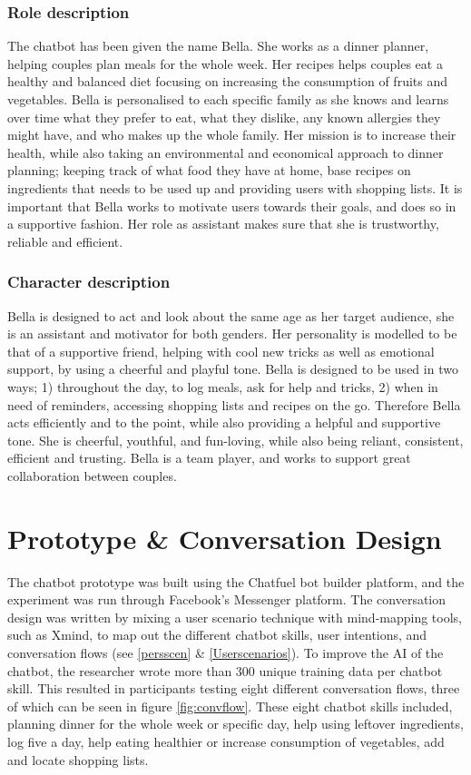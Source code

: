    \subsubsection{Role description}
    The chatbot has been given the name Bella. She works as a dinner planner, helping couples plan meals for the whole week. Her recipes helps couples eat a healthy and balanced diet focusing on increasing the consumption of fruits and vegetables. Bella is personalised to each specific family as she knows and learns over time what they prefer to eat, what they dislike, any known allergies they might have, and who makes up the whole family. Her mission is to increase their health, while also taking an environmental and economical approach to dinner planning; keeping track of what food they have at home, base recipes on ingredients that needs to be used up and providing users with shopping lists. It is important that Bella works to motivate users towards their goals, and does so in a supportive fashion. Her role as assistant makes sure that she is trustworthy, reliable and efficient.
    
    \subsubsection{Character description}
    Bella is designed to act and look about the same age as her target audience, she is an assistant and motivator for both genders. Her personality is modelled to be that of a supportive friend, helping with cool new tricks as well as emotional support, by using a cheerful and playful tone. Bella is designed to be used in two ways; 1) throughout the day, to log meals, ask for help and tricks, 2) when in need of reminders, accessing shopping lists and recipes on the go. Therefore Bella acts efficiently and to the point, while also providing a helpful and supportive tone. She is cheerful, youthful, and fun-loving, while also being reliant, consistent, efficient and trusting. Bella is a team player, and works to support great collaboration between couples. 

\vspace{5mm}

\section{Prototype \& Conversation Design}
The chatbot prototype was built using the Chatfuel bot builder platform, and the experiment was run through Facebook's Messenger platform. The conversation design was written by mixing a user scenario technique with mind-mapping tools, such as Xmind, to map out the different chatbot skills, user intentions, and conversation flows (see \ref{persscen} \& \ref{Userscenarios}). To improve the AI of the chatbot, the researcher wrote more than 300 unique training data per chatbot skill. This resulted in participants testing eight different conversation flows, three of which can be seen in figure \ref{fig:convflow}. These eight chatbot skills included, planning dinner for the whole week or specific day, help using leftover ingredients, log five a day, help eating healthier or increase consumption of vegetables, add and locate shopping lists.
    
